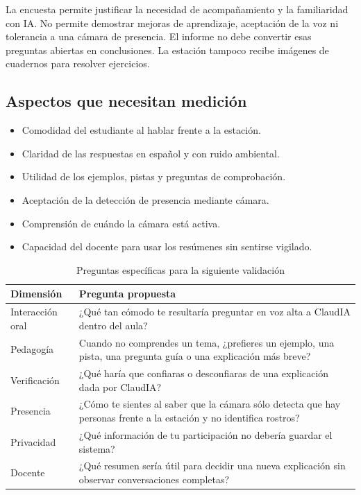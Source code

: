 \documentclass[letterpaper,11pt]{article}
\begin{document}
La encuesta permite justificar la necesidad de acompañamiento y la familiaridad con IA. No permite demostrar mejoras de aprendizaje, aceptación de la voz ni tolerancia a una cámara de presencia. El informe no debe convertir esas preguntas abiertas en conclusiones. La estación tampoco recibe imágenes de cuadernos para resolver ejercicios.

\subsection*{Aspectos que necesitan medición}
\begin{itemize}
  \item Comodidad del estudiante al hablar frente a la estación.
  \item Claridad de las respuestas en español y con ruido ambiental.
  \item Utilidad de los ejemplos, pistas y preguntas de comprobación.
  \item Aceptación de la detección de presencia mediante cámara.
  \item Comprensión de cuándo la cámara está activa.
  \item Capacidad del docente para usar los resúmenes sin sentirse vigilado.
\end{itemize}

\begin{table}[H]
\centering
\caption{Preguntas específicas para la siguiente validación}
\small
\begin{tabularx}{\textwidth}{@{}>{\raggedright\arraybackslash}p{1.28in}>{\raggedright\arraybackslash}X@{}}
\toprule
\textbf{Dimensión} & \textbf{Pregunta propuesta} \\
\midrule
Interacción oral & ¿Qué tan cómodo te resultaría preguntar en voz alta a ClaudIA dentro del aula? \\
Pedagogía & Cuando no comprendes un tema, ¿prefieres un ejemplo, una pista, una pregunta guía o una explicación más breve? \\
Verificación & ¿Qué haría que confiaras o desconfiaras de una explicación dada por ClaudIA? \\
Presencia & ¿Cómo te sientes al saber que la cámara sólo detecta que hay personas frente a la estación y no identifica rostros? \\
Privacidad & ¿Qué información de tu participación no debería guardar el sistema? \\
Docente & ¿Qué resumen sería útil para decidir una nueva explicación sin observar conversaciones completas? \\
\bottomrule
\end{tabularx}
\end{table}
\end{document}
